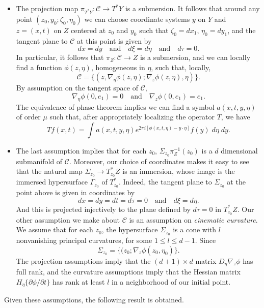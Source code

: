 \begin{itemize}
    \item The projection map $\pi_{T^* Y}: \mathcal{C} \to T^* Y$ is a submersion. It follows that around any point $(z_0,y_0;\zeta_0,\eta_0)$ we can choose coordinate systems $y$ on $Y$ and $z = (x,t)$ on $Z$ centered at $z_0$ and $y_0$ such that $\zeta_0 = dx_1$, $\eta_0 = dy_1$, and the tangent plane to $\mathcal{C}$ at this point is given by
    \[ dx = dy \quad\text{and}\quad d\xi = d\eta \quad\text{and}\quad d\tau = 0. \]
    In particular, it follows that $\pi_Z : \mathcal{C} \to Z$ is a submersion, and we can locally find a function $\phi(z,\eta)$, homogeneous in $\eta$, such that, locally,
    \[ \mathcal{C} = \{ (z, \nabla_\eta \phi(z,\eta) ; \nabla_z \phi(z,\eta), \eta) \}. \]
    By assumption on the tangent space of $\mathcal{C}$,
    \[ \nabla_\eta \phi(0,e_1) = 0 \quad\text{and}\quad \nabla_z \phi(0,e_1) = e_1. \]
    The equivalence of phase theorem implies we can find a symbol $a(x,t,y,\eta)$ of order $\mu$ such that, after appropriately localizing the operator $T$, we have
    \[ Tf(x,t) = \int a(x,t,y,\eta) e^{2 \pi i [\phi(x,t,\eta) - y \cdot \eta]} f(y)\; d \eta\; dy. \]

    \item The last assumption implies that for each $z_0$, $\Sigma_{z_0} \pi_Z^{-1}(z_0)$ is a $d$ dimensional submanifold of $\mathcal{C}$. Moreover, our choice of coordinates makes it easy to see that the natural map $\Sigma_{z_0} \to T^*_{z_0} Z$ is an immersion, whose image is the immersed hypersurface $\Gamma_{z_0}$ of $T^*_{z_0}$. Indeed, the tangent plane to $\Sigma_{z_0}$ at the point above is given in coordinates by
    \[ dx = dy = dt = d\tau = 0 \quad\text{and}\quad d\xi = d\eta. \]
    And this is projected injectively to the plane defined by $d\tau = 0$ in $T^*_{z_0} Z$. Our other assumption we make about $\mathcal{C}$ is an assumption on \emph{cinematic curvature}. We assume that for each $z_0$, the hypersurface $\Sigma_{z_0}$ is a cone with $l$ nonvanishing principal curvatures, for some $1 \leq l \leq d-1$. Since
    \[ \Sigma_{z_0} = \{ (z_0; \nabla_z \phi(z_0,\eta_0) \}. \]
    The projection assumptions imply that the $(d+1) \times d$ matrix $D_\eta \nabla_z \phi$ has full rank, and the curvature assumptions imply that the Hessian matrix $H_\eta \{ \partial \phi / \partial t \}$ has rank at least $l$ in a neighborhood of our initial point.
\end{itemize}
%
Given these assumptions, the following result is obtained.

